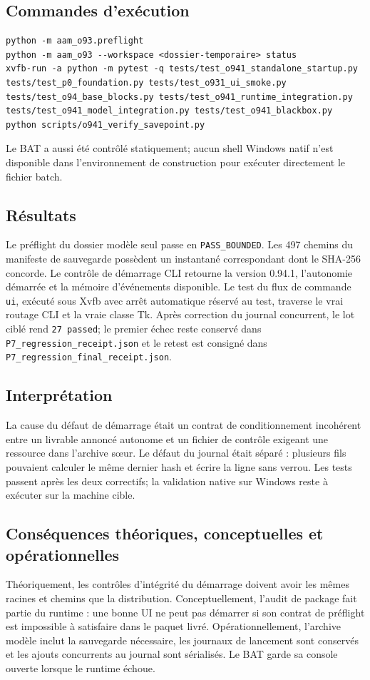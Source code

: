 \documentclass[11pt,a4paper]{article}
\begin{document}
\subsection{Commandes d'exécution}
\begin{verbatim}
python -m aam_o93.preflight
python -m aam_o93 --workspace <dossier-temporaire> status
xvfb-run -a python -m pytest -q tests/test_o941_standalone_startup.py tests/test_p0_foundation.py tests/test_o931_ui_smoke.py tests/test_o94_base_blocks.py tests/test_o941_runtime_integration.py tests/test_o941_model_integration.py tests/test_o941_blackbox.py
python scripts/o941_verify_savepoint.py
\end{verbatim}
Le BAT a aussi été contrôlé statiquement; aucun shell Windows natif n'est disponible dans l'environnement de construction pour exécuter directement le fichier batch.

\subsection{Résultats}
Le préflight du dossier modèle seul passe en \texttt{PASS\_BOUNDED}. Les 497 chemins du manifeste de sauvegarde possèdent un instantané correspondant dont le SHA-256 concorde. Le contrôle de démarrage CLI retourne la version 0.94.1, l'autonomie démarrée et la mémoire d'événements disponible. Le test du flux de commande \texttt{ui}, exécuté sous Xvfb avec arrêt automatique réservé au test, traverse le vrai routage CLI et la vraie classe Tk. Après correction du journal concurrent, le lot ciblé rend \texttt{27 passed}; le premier échec reste conservé dans \texttt{P7\_regression\_receipt.json} et le retest est consigné dans \texttt{P7\_regression\_final\_receipt.json}.

\subsection{Interprétation}
La cause du défaut de démarrage était un contrat de conditionnement incohérent entre un livrable annoncé autonome et un fichier de contrôle exigeant une ressource dans l'archive sœur. Le défaut du journal était séparé : plusieurs fils pouvaient calculer le même dernier hash et écrire la ligne sans verrou. Les tests passent après les deux correctifs; la validation native sur Windows reste à exécuter sur la machine cible.

\subsection{Conséquences théoriques, conceptuelles et opérationnelles}
Théoriquement, les contrôles d'intégrité du démarrage doivent avoir les mêmes racines et chemins que la distribution. Conceptuellement, l'audit de package fait partie du runtime : une bonne UI ne peut pas démarrer si son contrat de préflight est impossible à satisfaire dans le paquet livré. Opérationnellement, l'archive modèle inclut la sauvegarde nécessaire, les journaux de lancement sont conservés et les ajouts concurrents au journal sont sérialisés. Le BAT garde sa console ouverte lorsque le runtime échoue.
\end{document}
